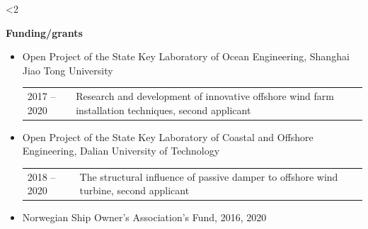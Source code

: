 \documentclass[10pt]{ctexart}
\begin{document}
\ifnum\value{num}<2 {
    \textbf{Funding/grants}
    \begin{itemize}[label={}] \setlength\itemsep{0.5em}
    \item Open Project of the State Key Laboratory of Ocean Engineering, Shanghai Jiao Tong University \\
    \begin{tabular}[t]{R{0.15\columnwidth}L{0.85\columnwidth}}
        2017 -- 2020 &  Research and development of innovative offshore wind farm installation techniques, second applicant\\
    \end{tabular}%
    \item Open Project of the State Key Laboratory of Coastal and Offshore Engineering, Dalian University of Technology\\
    \begin{tabular}[t]{R{0.15\columnwidth}L{0.85\columnwidth}}
        2018 -- 2020 &  The structural influence of passive damper to offshore wind turbine, second applicant\\
    \end{tabular}%
    \item Norwegian Ship Owner's Association's Fund, 2016, 2020
    \end{itemize}
    \vspace*{0.5em}
}\else{

}\fi
\end{document}
